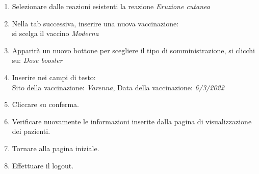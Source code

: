 \documentclass{article}
\begin{document}
\begin{enumerate}
        \item Selezionare dalle reazioni esistenti la reazione \textit{Eruzione cutanea}
        \item Nella tab successiva, inserire una nuova vaccinazione:\\
            si scelga il vaccino \textit{Moderna}
        \item Apparirà un nuovo bottone per scegliere il tipo di somministrazione, si clicchi su: \textit{Dose booster}
        \item Inserire nei campi di testo:\\
            Sito della vaccinazione: \textit{Varenna}, Data della vaccinazione: \textit{6/3/2022}
        \item Cliccare su conferma.
        \item Verificare nuovamente le informazioni inserite dalla pagina di visualizzazione dei pazienti.
        \item Tornare alla pagina iniziale.
        \item Effettuare il logout.
    \end{enumerate}
\end{document}
